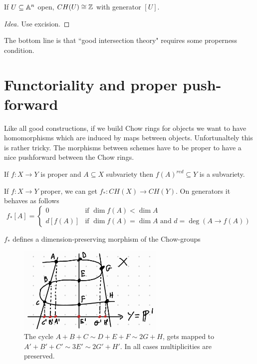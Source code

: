 \begin{corollary}
If $U\subseteq \mathbb{A}^n$ open, $CH(U)\cong \mathbb{Z}$ with generator $[U]$.
\end{corollary}
\begin{proof}[Idea]
Use excision.
\end{proof}


\begin{center}
The bottom line is that ``good intersection theory" requires some properness condition.
\end{center}


\section{Functoriality and proper push-forward}
Like all good constructions, if we build Chow rings for objects we want to have homomorphisms which are induced by maps between objects. Unfortunaltely this is rather tricky. The morphisms between schemes have to be proper to have a nice pushforward between the Chow rings. 

\begin{remark}
If $f:X\to Y$ is proper and $A\subseteq X$ subvariety then $f(A)^{red}\subseteq Y$ is a subvariety.
\end{remark}



\begin{theorem}
If $f:X\to Y$ proper, we can get $f_\ast:CH(X)\to CH(Y)$. On generators it behaves as follows
\[f_\ast[A]=\begin{cases}
0 &\text{if }\dim f(A)<\dim A\\
d[f(A)] &\text{if }\dim f(A)=\dim A\text{ and }d=\deg(A\to f(A))
\end{cases}\]
\end{theorem}

\begin{theorem}
$f_\ast$ defines a dimension-preserving morphism of the Chow-groups
\end{theorem}

\begin{figure}[!htb]
	\centering
	\includegraphics[width=7cm]{Images/degree-pushforward.png}
	\caption{The cycle $A+B+C\sim D+E+F\sim 2G+H$, gets mapped to $A'+B'+C'\sim 3E'\sim 2G'+H'$. In all cases multiplicities are preserved.}
\end{figure}


